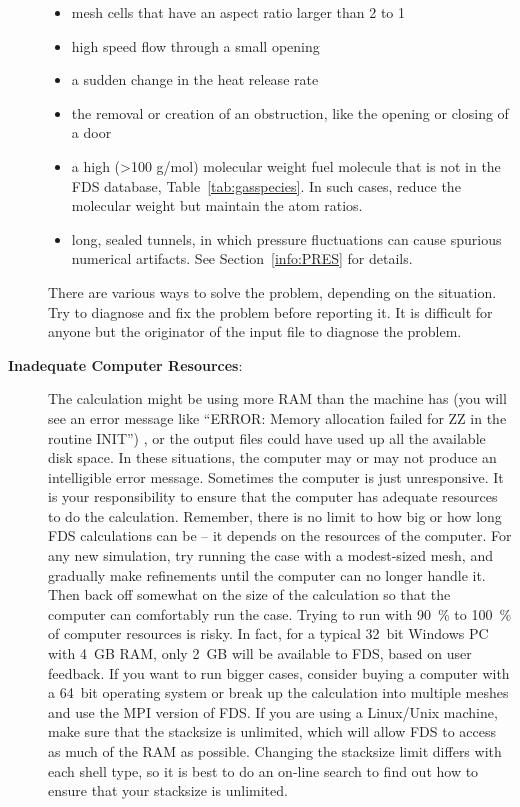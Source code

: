 \documentclass[11pt]{book}
\begin{document}
\begin{description}
    \begin{itemize}
    \item mesh cells that have an aspect ratio larger than 2 to 1
    \item high speed flow through a small opening
    \item a sudden change in the heat release rate
    \item the removal or creation of an obstruction, like the opening or closing of a door
    \item a high (>100 g/mol) molecular weight fuel molecule that is not in the FDS database, Table~\ref{tab:gasspecies}. In such cases, reduce the molecular weight but maintain the atom ratios.
    \item long, sealed tunnels, in which pressure fluctuations can cause spurious numerical artifacts. See Section~\ref{info:PRES} for details.
    \end{itemize}
    There are various ways to solve the problem, depending on the situation. Try to diagnose and fix the problem before reporting it. It is difficult for anyone but the originator of the input file to diagnose the problem.
\item[{\bf Inadequate Computer Resources}:] The calculation might be using more RAM than the machine has (you will see an error message like ``ERROR: Memory allocation failed for ZZ in the routine INIT'') , or the output files could have used up all the available disk space. In these situations, the computer may or may not produce an intelligible error message. Sometimes the computer is just unresponsive. It is your responsibility to ensure that the computer has adequate resources to do the calculation. Remember, there is no limit to how big or how long FDS calculations can be -- it depends on the resources of the computer. For any new simulation, try running the case with a modest-sized mesh, and gradually make refinements until the computer can no longer handle it. Then back off somewhat on the size of the calculation so that the computer can comfortably run the case. Trying to run with 90~\% to 100~\% of computer resources is risky. In fact, for a typical 32~bit Windows PC with 4~GB RAM, only 2~GB will be available to FDS, based on user feedback. If you want to run bigger cases, consider buying a computer with a 64~bit operating system or break up the calculation into multiple meshes and use the MPI version of FDS. If you are using a Linux/Unix machine, make sure that the stacksize is unlimited, which will allow FDS to access as much of the RAM as possible. Changing the stacksize limit differs with each shell type, so it is best to do an on-line search to find out how to ensure that your stacksize is unlimited.

\end{description}
\end{document}

